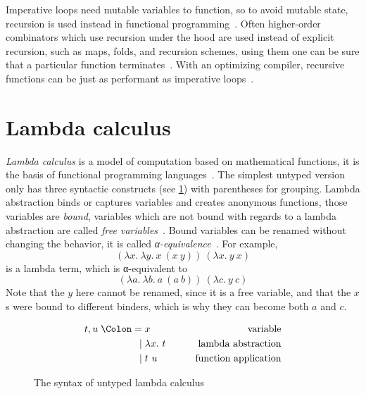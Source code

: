 Imperative loops need mutable variables to function, so to avoid mutable state,
recursion is used instead in functional programming~\cite{functional-Hudak}.
Often higher-order combinators which use recursion under the hood are used
instead of explicit recursion, such as maps, folds, and recursion schemes, using
them one can be sure that a particular function terminates~\cite{fold-Hutton,
  bananas-Meijer}. With an optimizing compiler, recursive functions can be just as
performant as imperative loops~\cite{sicp}.

\section{Lambda calculus}\label{sec:lambda}

\emph{Lambda calculus} is a model of computation based on mathematical
functions, it is the basis of functional programming
languages~\cite{functional-Hudak}. The simplest untyped version only has three
syntactic constructs (see \cref{fig:lambda-syntax}) with parentheses for
grouping. Lambda abstraction binds or captures variables and creates anonymous
functions, those variables are \emph{bound}, variables which are not bound with
regards to a lambda abstraction are called \emph{free
  variables}~\cite{functional-Barendregt, lambda-Hindley, lambda-Church}. Bound
variables can be renamed without changing the behavior, it is called
\emph{α-equivalence}~\cite{lambda-Revesz, lambda-Barendregt, type-Pierce}. For
example,
\begin{equation}
  (\lambda x.\ \lambda y.\ x\ (x\ y))\ (\lambda x.\ y\ x)
  \label{eq:lambda-ex}
\end{equation} is a
lambda term, which is α-equivalent to
\begin{equation}
  (\lambda a.\ \lambda b.\ a\ (a\ b))\ (\lambda c.\ y\ c)
  \label{eq:lambda-ex-rename}
\end{equation}
Note that the \(y\) here cannot be renamed, since it is a free variable, and
that the \(x\)s were bound to different binders, which is why they can become
both \(a\) and \(c\).

\begin{figure}
  \begin{alignat*}{2}
    t, u \Coleqq{} & x             & \qquad\text{variable}             \\
    \mid{}         & \lambda x.\ t & \qquad\text{lambda abstraction}   \\
    \mid{}         & t\ u          & \qquad\text{function application}
  \end{alignat*}
  \caption{The syntax of untyped lambda calculus}\label{fig:lambda-syntax}
\end{figure}


